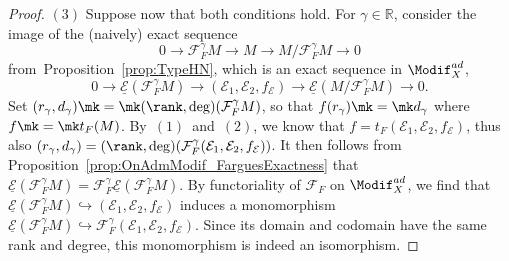 \begin{proof}
$(3)$
Suppose now that both conditions hold. For $\gamma\in\mathbb{R}$, consider the image of the (naively) exact sequence
\[
0\rightarrow\mathcal{F}_{F}^{\gamma}M\rightarrow M\rightarrow M/\mathcal{F}_{F}^{\gamma}M\rightarrow0
\]
from~Proposition~\ref{prop:TypeHN}, which is an exact sequence in $\Modif_{X}^{ad}$,
\[
0\rightarrow\underline{\mathcal{E}}(\mathcal{F}_{F}^{\gamma}M)\rightarrow(\mathcal{E}_{1},\mathcal{E}_{2},f_{\mathcal{E}})\rightarrow\underline{\mathcal{E}}(M/\mathcal{F}_{F}^{\gamma}M)\rightarrow0.
\]
Set $(r_{\gamma},d_{\gamma})\mk=\mk(\rank,\deg)(\mathcal{F}_{F}^{\gamma}M)$, so that $f(r_{\gamma})\mk=\mk d_{\gamma}$ where $f\mk=\mk t_{F}(M)$. By~$(1)$~and~$(2)$, we know that $f=t_{F}(\mathcal{E}_{1},\mathcal{E}_{2},f_{\mathcal{E}})$, thus also $(r_{\gamma},d_{\gamma})=(\rank,\deg)(\mathcal{F}_{F}^{\gamma}(\mathcal{E}_{1},\mathcal{E}_{2},f_{\mathcal{E}}))$. It then follows from Proposition~\ref{prop:OnAdmModif_FarguesExactness} that $\underline{\mathcal{E}}(\mathcal{F}_{F}^{\gamma}M)=\mathcal{F}_{F}^{\gamma}\underline{\mathcal{E}}(\mathcal{F}_{F}^{\gamma}M)$. By functoriality of $\mathcal{F}_{F}$ on $\Modif_{X}^{ad}$, we find that $\underline{\mathcal{E}}(\mathcal{F}_{F}^{\gamma}M)\hookrightarrow(\mathcal{E}_{1},\mathcal{E}_{2},f_{\mathcal{E}})$ induces a monomorphism $\underline{\mathcal{E}}(\mathcal{F}_{F}^{\gamma}M)\hookrightarrow\mathcal{F}_{F}^{\gamma}(\mathcal{E}_{1},\mathcal{E}_{2},f_{\mathcal{E}})$. Since its domain and codomain have the same rank and degree, this monomorphism is indeed an isomorphism.
\end{proof}

